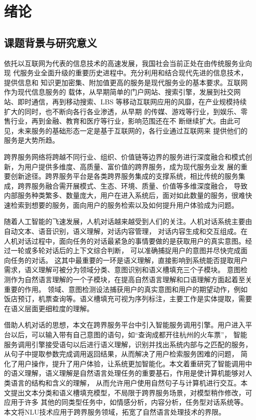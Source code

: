 \chapter{绪论}

\section{课题背景与研究意义}

依托以互联网为代表的信息技术的高速发展，我国社会当前正处在由传统服务业向现
代服务业全面升级的重要历史进程中。充分利用和结合现代先进的信息技术，提供信息和
知识更加密集、附加值更高的服务是现代服务业的基本要求。互联网作为现代信息服务的
载体，从早期简单的门户网站、搜索引擎，发展到社交网站、即时通信，再到移动搜索、LBS
等移动互联网应用的风靡，在产业规模持续扩大的同时，也不断向各行各业渗透，从早期
的传媒、游戏等行业，到娱乐、零售行业，再到金融、教育和医疗等行业，影响范围还在不
断继续扩大\cite{王晓玲2015我国现代服务业借力}。由此可见，未来服务的基础形态一定是基于互联网的，各行业通过互联网来
提供他们的服务是大势所趋。


跨界服务网络将跨越不同行业、组织、价值链等边界的服务进行深度融合和模式创新，为用户提供多维度、高质量、富价值的跨界服务，成为现代服务业发
展的重要创新途径。跨界服务平台是各类跨界服务集成的支撑系统，相比传统的服务集成，跨界服务融合需开展模式、生态、环境、质量、价值等多维深度融合，
导致内部服务种类繁多、数量庞大，用户在进入系统后，面对如此数量的服务，很难快速检索到想要的服务，面向用户的服务检索以及如何提升用户体验成为问题。

随着人工智能的飞速发展，人机对话越来越受到人们的关注。人机对话系统主要由自动文本、语音识别，语义理解，对话内容管理，
对话内容生成和交互组成。在人机对话过程中，面向任务的对话最紧急的事情要做的是获取用户的真实意图。经过一轮或多轮对话后的上下文综合判断，
可以准确捕捉用户的意图并尽快完成面向任务的对话。
这其中最重要的一环是语义理解，直接影响到系统能否提取用户需求，语义理解可被分为领域分类、意图识别和语义槽填充三个子模块。
意图检测作为自然语言理解的一个子模块，在提高自然语言理解和口语理解方面起着至关重要的作用。
领域、意图检测设法捕获用户的真实意图和用户的期望动作，例如饭店预订，机票查询等。语义槽填充可视为序列标注，主要工作是实体提取，需要在语义层面更细粒度的理解。

借助人机对话的思想，本文在跨界服务平台中引入智能服务调用引擎。用户进入平台以后，可以输入带有自己意图的语句，如“查询成都开往杭州的火车票”，
智能服务调用引擎接受语句以后进行语义理解，识别并找出系统内部与之匹配的服务，从句子中提取参数完成调用返回结果，从而解决了用户检索服务困难的问题，
简化了用户操作，提升了用户体验，让系统更加智能化。本文着重研究了智能调用中的语义理解，语义理解是自然语言处理任务的重要基石，作用是使计算机能够对人类语言的结构和含义的理解，
从而允许用户使用自然句子与计算机进行交互。本文提出文本分类和语义槽填充模型，不局限于跨界服务场景，对模型稍作修改，可应用于许多
其他的同类型任务中，如情感分析，内容分析，任务型对话系统等。本文将NLU技术应用于跨界服务领域，拓宽了自然语言处理技术的界限。

